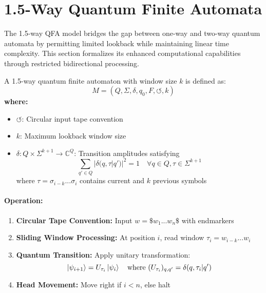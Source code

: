 \section{1.5-Way Quantum Finite Automata}
\label{sec:1.5qfa}

The 1.5-way QFA model bridges the gap between one-way and two-way quantum automata by permitting limited lookback while maintaining linear time complexity. This section formalizes its enhanced computational capabilities through restricted bidirectional processing.


\begin{definition}
A 1.5-way quantum finite automaton with window size $k$ is defined as:
\[
M = (Q, \Sigma, \delta, q_0, F, \circlearrowleft, k)
\]
\textbf{where:}
\begin{itemize}
    \item $\circlearrowleft$: Circular input tape convention
    \item $k$: Maximum lookback window size
    \item $\delta: Q \times \Sigma^{k+1} \rightarrow \mathbb{C}^Q$: Transition amplitudes satisfying
    \[
    \sum_{q'\in Q} |\delta(q,\tau|q')|^2 = 1 \quad \forall q \in Q, \tau \in \Sigma^{k+1}
    \]
    where $\tau = \sigma_{i-k}...\sigma_i$ contains current and $k$ previous symbols
\end{itemize}
\end{definition}

\paragraph{Operation:}
\begin{enumerate}
    \item \textbf{Circular Tape Convention:} Input $w = \$w_1...w_n\$$ with endmarkers
    \item \textbf{Sliding Window Processing:} At position $i$, read window $\tau_i = w_{i-k}...w_i$
    \item \textbf{Quantum Transition:} Apply unitary transformation:
    \[
    \ket{\psi_{i+1}} = U_{\tau_i} \ket{\psi_i} \quad \text{where } (U_{\tau_i})_{q,q'} = \delta(q,\tau_i|q')
    \]
    \item \textbf{Head Movement:} Move right if $i < n$, else halt
\end{enumerate}

